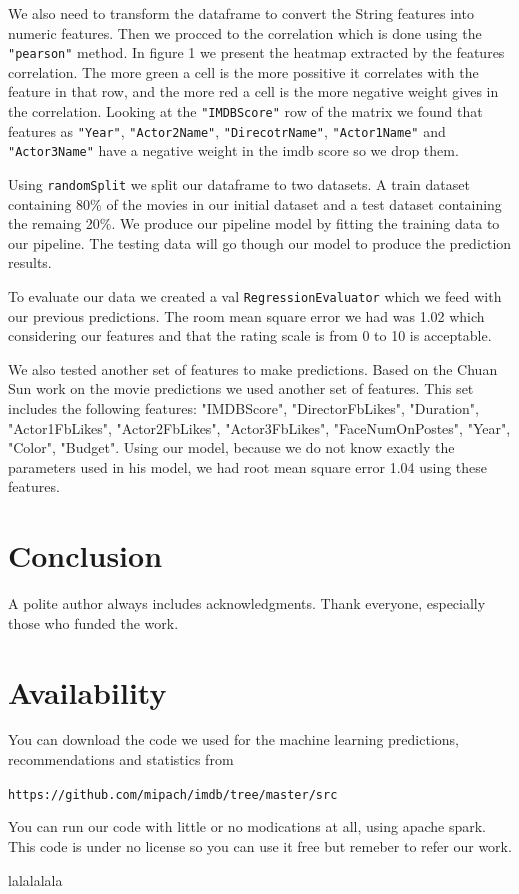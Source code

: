 \documentclass[letterpaper,twocolumn,10pt]{article}
\begin{document}
We also need to transform the dataframe to convert the String features into numeric features. Then we procced to the correlation which is done using the \texttt{"pearson"} method. In figure 1 we present the heatmap extracted by the features correlation. The more green a cell is the more possitive it correlates with the feature in that row, and the more red a cell is the more negative weight gives in the correlation. Looking at the \texttt{"IMDBScore"} row of the matrix we found that features as \texttt{"Year"}, \texttt{"Actor2Name"}, \texttt{"DirecotrName"}, \texttt{"Actor1Name"} and \texttt{"Actor3Name"} have a negative weight in the imdb score so we drop them.

Using \texttt{randomSplit} we split our dataframe to two datasets. A train dataset containing 80\% of the movies in our initial dataset and a test dataset containing the remaing 20\%. We produce our pipeline model by fitting the training data to our pipeline. The testing data will go though our model to produce the prediction results.\par 

To evaluate our data we created a val \texttt{RegressionEvaluator} which we feed with our previous predictions. The room mean square error we had was 1.02 which considering our features and that the rating scale is from 0 to 10 is acceptable.

We also tested another set of features to make predictions. Based on the Chuan Sun work on the movie predictions we used another set of features. This set includes the following features: "IMDBScore", "DirectorFbLikes", "Duration", "Actor1FbLikes", "Actor2FbLikes", "Actor3FbLikes", "FaceNumOnPostes", "Year", "Color", "Budget". Using our model, because we do not know exactly the parameters used in his model, we had root mean square error 1.04 using these features.  
\section{Conclusion}

A polite author always includes acknowledgments.  Thank everyone,
especially those who funded the work. 

\section{Availability}

You can download the code we used for the machine learning predictions, recommendations and statistics from

\begin{center}
{\tt https://github.com/mipach/imdb/tree/master/src}\\
\end{center}

You can run our code with little or no modications at all, using apache spark. This code is under no license so you can use it free but remeber to refer our work.


{\footnotesize 
}
lalalalala
\end{document}
